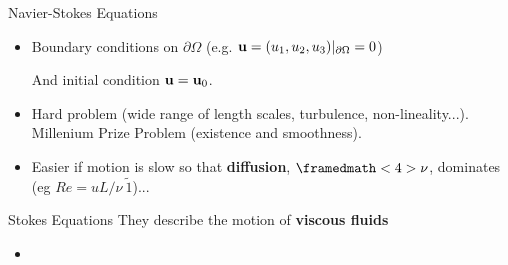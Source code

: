 \begin{frame}{Navier-Stokes Equations}
\begin{itemize}
    \item<3> \alert{Boundary conditions} on $\partial\Omega$
      (e.g. $\mathbf{u}=(u_1,u_2,u_3)|_{\partial\Omega}=0$)
      \par And initial condition $\mathbf{u}=\mathbf{u}_0$.
    \item<3> \alert{Hard problem} (wide range of
      length scales, turbulence, non-lineality...). Millenium Prize
      Problem (existence and smoothness).
    \item<4> Easier if motion is slow so that \textbf{diffusion},
      $\framedmath<4>{\nu}$, dominates (eg $Re=uL/\nu\ \tilde 1$)...
    \end{itemize}
\end{frame}

\begin{frame}{Stokes Equations}
  They describe the motion of \textbf{viscous fluids}
  \begin{itemize}\itemsep0.9em
  \item
  \end{itemize}
\end{frame}

